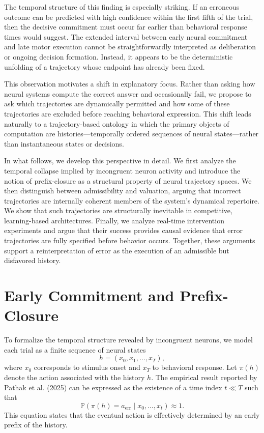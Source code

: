 \documentclass[11pt]{article}
\newcommand{\prob}{\mathbb{P}}
\begin{document}
The temporal structure of this finding is especially striking. If an erroneous outcome can be predicted with high confidence within the first fifth of the trial, then the decisive commitment must occur far earlier than behavioral response times would suggest. The extended interval between early neural commitment and late motor execution cannot be straightforwardly interpreted as deliberation or ongoing decision formation. Instead, it appears to be the deterministic unfolding of a trajectory whose endpoint has already been fixed.

This observation motivates a shift in explanatory focus. Rather than asking how neural systems compute the correct answer and occasionally fail, we propose to ask which trajectories are dynamically permitted and how some of these trajectories are excluded before reaching behavioral expression. This shift leads naturally to a trajectory-based ontology in which the primary objects of computation are histories—temporally ordered sequences of neural states—rather than instantaneous states or decisions.

In what follows, we develop this perspective in detail. We first analyze the temporal collapse implied by incongruent neuron activity and introduce the notion of prefix-closure as a structural property of neural trajectory spaces. We then distinguish between admissibility and valuation, arguing that incorrect trajectories are internally coherent members of the system’s dynamical repertoire. We show that such trajectories are structurally inevitable in competitive, learning-based architectures. Finally, we analyze real-time intervention experiments and argue that their success provides causal evidence that error trajectories are fully specified before behavior occurs. Together, these arguments support a reinterpretation of error as the execution of an admissible but disfavored history.

\section{Early Commitment and Prefix-Closure}

To formalize the temporal structure revealed by incongruent neurons, we model each trial as a finite sequence of neural states
\[
h = (x_0, x_1, \ldots, x_T),
\]
where $x_0$ corresponds to stimulus onset and $x_T$ to behavioral response. Let $\pi(h)$ denote the action associated with the history $h$. The empirical result reported by Pathak et al. (2025) can be expressed as the existence of a time index $t \ll T$ such that
\[
\prob(\pi(h) = a_{\text{err}} \mid x_0, \ldots, x_t) \approx 1.
\]
This equation states that the eventual action is effectively determined by an early prefix of the history.
\end{document}
